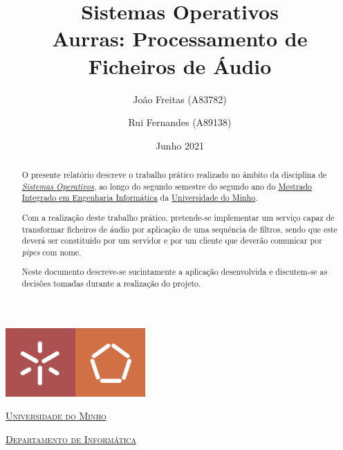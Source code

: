 \documentclass[a4paper, 11pt]{article}
\title{Sistemas Operativos \\ [0.8em] \smaller{} Aurras: Processamento de Ficheiros de Áudio}
\author{João Freitas (A83782) \and Rui Fernandes (A89138)}
\date{Junho 2021}
\begin{document}
\begin{titlepage}
    \begin{center}
        \begin{minipage}{0.75\linewidth}
            \centering
            \includegraphics[width=0.4\textwidth]{img/EEUM.png}\par\vspace{1cm}
            \vspace{1.5cm}
            \href{https://www.uminho.pt/PT}{\scshape\LARGE Universidade do Minho} \par
            \vspace{1cm}
            \href{https://www.di.uminho.pt/}{\scshape\Large Departamento de Informática} \par
            \vspace{1.5cm}
            \maketitle
        \end{minipage}
    \end{center}
    \vspace{2cm}
    \thispagestyle{empty}
    \clearpage
\end{titlepage}


\begin{abstract}
O presente relatório descreve o trabalho prático realizado no âmbito da disciplina de 
\href{http://miei.di.uminho.pt/plano_estudos.html#sistemas_operativos}{\emph {Sistemas 
Operativos}}, ao longo do segundo semestre do segundo ano do 
\href{http://miei.di.uminho.pt}{Mestrado Integrado em Engenharia Informática} da 
\href{https://www.uminho.pt}{Universidade do Minho}.

Com a realização deste trabalho prático, pretende-se implementar um serviço capaz de 
transformar ficheiros de áudio por aplicação de uma sequência de filtros, sendo que este 
deverá ser constituído por um servidor e por um cliente que deverão comunicar por \textit{pipes} 
com nome.

Neste documento descreve-se sucintamente a aplicação desenvolvida e discutem-se as decisões 
tomadas durante a realização do projeto.
\end{abstract}
\end{document}
